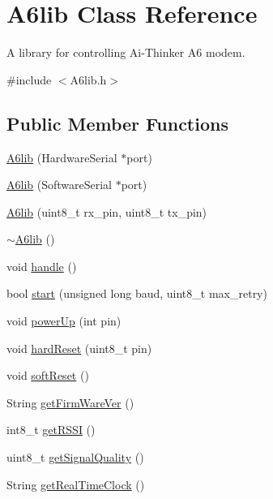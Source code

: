 \hypertarget{class_a6lib}{}\section{A6lib Class Reference}
\label{class_a6lib}


A library for controlling Ai-\/\+Thinker A6 modem.  




{\ttfamily \#include $<$A6lib.\+h$>$}

\subsection*{Public Member Functions}
\begin{DoxyCompactItemize}
\item 
\mbox{\hyperlink{class_a6lib_a5cbcf78590cf824bfaa16b181b6ac4a1}{A6lib}} (Hardware\+Serial $\ast$port)
\item 
\mbox{\hyperlink{class_a6lib_a415ffc3dc0178a4ee8fdf3e718ef14a9}{A6lib}} (Software\+Serial $\ast$port)
\item 
\mbox{\hyperlink{class_a6lib_a318fb5617771079545af012b28f6a1e7}{A6lib}} (uint8\+\_\+t rx\+\_\+pin, uint8\+\_\+t tx\+\_\+pin)
\item 
\mbox{\hyperlink{class_a6lib_aac4fbb7021b2f1741b01d72b606d5081}{$\sim$\+A6lib}} ()
\item 
void \mbox{\hyperlink{class_a6lib_adcc817ae29dd20892faf53fd3a8b1bac}{handle}} ()
\item 
bool \mbox{\hyperlink{class_a6lib_a4c9b1bef86c734cb57e7962936ecf481}{start}} (unsigned long baud, uint8\+\_\+t max\+\_\+retry)
\item 
void \mbox{\hyperlink{class_a6lib_add46e8926e5809cc7e33a7ad2817fcc5}{power\+Up}} (int pin)
\item 
void \mbox{\hyperlink{class_a6lib_a7ddb0b59879dcc59290b72a585231ef2}{hard\+Reset}} (uint8\+\_\+t pin)
\item 
void \mbox{\hyperlink{class_a6lib_a8b64136d0c8aba6af51568ff93a5455e}{soft\+Reset}} ()
\item 
String \mbox{\hyperlink{class_a6lib_a92cc2f3cd1f793bf1bf77a3b528aba81}{get\+Firm\+Ware\+Ver}} ()
\item 
int8\+\_\+t \mbox{\hyperlink{class_a6lib_a6cfaf041a05b6d86fbc5c18aa196bd0c}{get\+R\+S\+SI}} ()
\item 
uint8\+\_\+t \mbox{\hyperlink{class_a6lib_a90a1e3733155181d56c02f7973066ddf}{get\+Signal\+Quality}} ()
\item 
String \mbox{\hyperlink{class_a6lib_ab18ee06ead6ceac9716265c0e418b83b}{get\+Real\+Time\+Clock}} ()

\end{DoxyCompactItemize}
